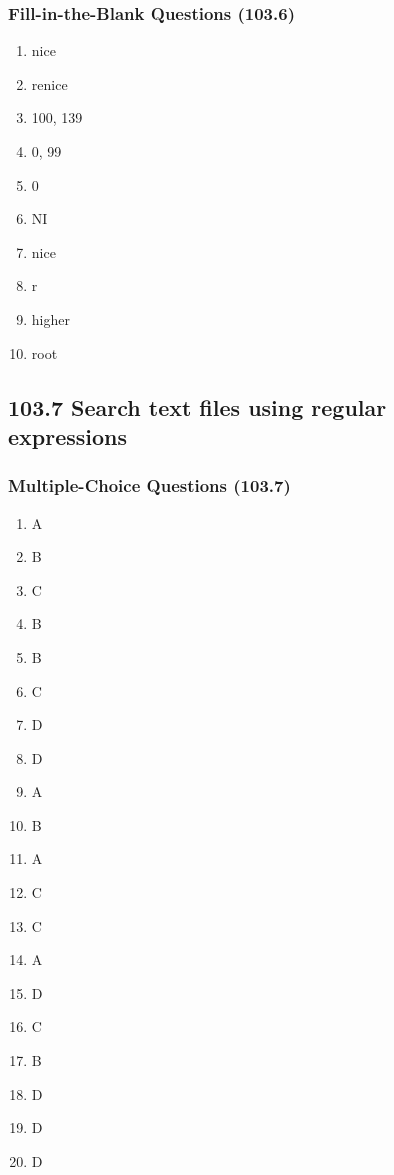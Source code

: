 \documentclass[a4paper]{report}
\begin{document}
\subsubsection*{Fill-in-the-Blank Questions (103.6)}
\begin{enumerate}[1.]
    \item nice
    \item renice
    \item 100, 139
    \item 0, 99
    \item 0
    \item NI
    \item nice
    \item r
    \item higher
    \item root
\end{enumerate}


\subsection*{103.7 Search text files using regular expressions}
\subsubsection*{Multiple-Choice Questions (103.7)}
\begin{enumerate}[1.]
    \item A
    \item B
    \item C
    \item B
    \item B
    \item C
    \item D
    \item D
    \item A
    \item B
    \item A
    \item C
    \item C
    \item A
    \item D
    \item C
    \item B
    \item D
    \item D
    \item D
\end{enumerate}
\end{document}
